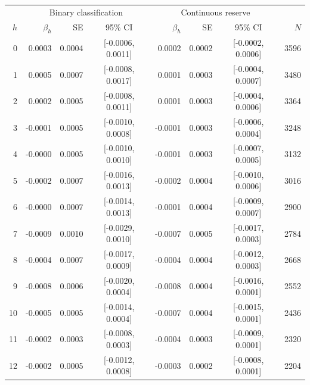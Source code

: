 \begin{tabular}{r r r c r r c r}
\toprule
 & \multicolumn{3}{c}{Binary classification} & \multicolumn{3}{c}{Continuous reserve} & \\
$h$ & $\beta_h$ & SE & 95\% CI & $\beta_h$ & SE & 95\% CI & $N$ \\
\midrule
0 & 0.0003 & 0.0004 & [-0.0006, 0.0011] & 0.0002 & 0.0002 & [-0.0002, 0.0006] & 3596 \\
1 & 0.0005 & 0.0007 & [-0.0008, 0.0017] & 0.0001 & 0.0003 & [-0.0004, 0.0007] & 3480 \\
2 & 0.0002 & 0.0005 & [-0.0008, 0.0011] & 0.0001 & 0.0003 & [-0.0004, 0.0006] & 3364 \\
3 & -0.0001 & 0.0005 & [-0.0010, 0.0008] & -0.0001 & 0.0003 & [-0.0006, 0.0004] & 3248 \\
4 & -0.0000 & 0.0005 & [-0.0010, 0.0010] & -0.0001 & 0.0003 & [-0.0007, 0.0005] & 3132 \\
5 & -0.0002 & 0.0007 & [-0.0016, 0.0013] & -0.0002 & 0.0004 & [-0.0010, 0.0006] & 3016 \\
6 & -0.0000 & 0.0007 & [-0.0014, 0.0013] & -0.0001 & 0.0004 & [-0.0009, 0.0007] & 2900 \\
7 & -0.0009 & 0.0010 & [-0.0029, 0.0010] & -0.0007 & 0.0005 & [-0.0017, 0.0003] & 2784 \\
8 & -0.0004 & 0.0007 & [-0.0017, 0.0009] & -0.0004 & 0.0004 & [-0.0012, 0.0003] & 2668 \\
9 & -0.0008 & 0.0006 & [-0.0020, 0.0004] & -0.0008 & 0.0004 & [-0.0016, 0.0001] & 2552 \\
10 & -0.0005 & 0.0005 & [-0.0014, 0.0004] & -0.0007 & 0.0004 & [-0.0015, 0.0001] & 2436 \\
11 & -0.0002 & 0.0003 & [-0.0008, 0.0003] & -0.0004 & 0.0003 & [-0.0009, 0.0001] & 2320 \\
12 & -0.0002 & 0.0005 & [-0.0012, 0.0008] & -0.0003 & 0.0002 & [-0.0008, 0.0001] & 2204 \\
\bottomrule
\end{tabular}
